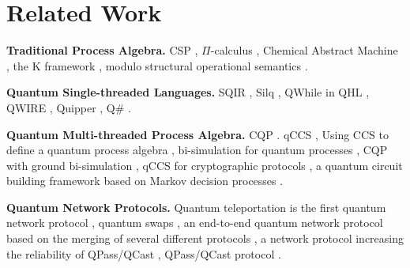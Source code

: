 \section{Related Work}
\label{Related Work}

\noindent\textbf{Traditional Process Algebra.}
CSP \cite{CSPm,FDR2}, $\Pi$-calculus \cite{DBLP:conf/concur/Sangiori93}, Chemical Abstract Machine \cite{BERRY1992217},
the K framework \cite{rosu-serbanuta-2010-jlap}, modulo structural operational semantics \cite{MOSSES2004195}.

\noindent\textbf{Quantum Single-threaded Languages.}
SQIR \cite{VOQC}, Silq \cite{sliqlanguage}, QWhile in QHL \cite{10.1007/s00165-018-0465-3}, QWIRE \cite{Rand2018ReQWIRERA}, Quipper \cite{10.1145/2491956.2462177}, Q\# \cite{qsharp}.

\noindent\textbf{Quantum Multi-threaded Process Algebra.}
CQP \cite{9165801}. qCCS \cite{10.1145/1507244.1507249}, Using CCS to define a quantum process algebra \cite{10.1145/977091.977108},
bi-simulation for quantum processes \cite{10.1145/2400676.2400680}, CQP with ground bi-simulation \cite{10.1007/978-3-030-45237-7_2},
qCCS for cryptographic protocols \cite{https://doi.org/10.48550/arxiv.1507.05278},
a quantum circuit building framework based on Markov decision processes \cite{https://doi.org/10.48550/arxiv.2207.03403}.

\noindent\textbf{Quantum Network Protocols.}
Quantum teleportation is the first quantum network protocol \cite{PhysRevLett.70.1895},
quantum swaps \cite{fundamentallimits,10.1126/science.aam9288}, 
an end-to-end quantum network protocol based on the merging of several different protocols \cite{10.1145/3386367.3431293},
a network protocol increasing the reliability of QPass/QCast \cite{Pirker_2019},
QPass/QCast protocol \cite{10.1145/3387514.3405853}.  
